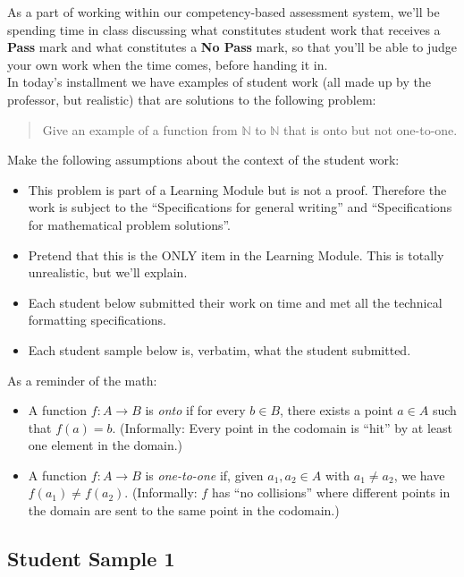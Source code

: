\documentclass[11pt,letterpaper]{article}
\begin{document}
As a part of working within our competency-based assessment system, we'll be spending time in class discussing what constitutes student work that receives a \textbf{Pass} mark and what constitutes a \textbf{No Pass} mark, so that you'll be able to judge your own work when the time comes, before handing it in. \\

In today's installment we have examples of student work (all made up by the professor, but realistic) that are solutions to the following problem: 
\begin{quote}
	Give an example of a function from $\mathbb{N}$ to $\mathbb{N}$ that is onto but not one-to-one. 
\end{quote}
Make the following assumptions about the context of the student work: 
\begin{itemize}
	\item This problem is part of a Learning Module but is not a proof. Therefore the work is subject to the ``Specifications for general writing'' and ``Specifications for mathematical problem solutions''. 
	\item Pretend that this is the ONLY item in the Learning Module. This is totally unrealistic, but we'll explain. 
	\item Each student below submitted their work on time and met all the technical formatting specifications. 
	\item Each student sample below is, verbatim, what the student submitted. 
\end{itemize}

As a reminder of the math: 
\begin{itemize}
	\item A function $f: A \rightarrow B$ is \emph{onto} if for every $b \in B$, there exists a point $a \in A$ such that $f(a) = b$. (Informally: Every point in the codomain is ``hit'' by at least one element in the domain.) 
	\item A function $f: A \rightarrow B$ is \emph{one-to-one} if, given $a_1, a_2 \in A$ with $a_1 \neq a_2$, we have $f(a_1) \neq f(a_2)$. (Informally: $f$ has ``no collisions'' where different points in the domain are sent to the same point in the codomain.) 
\end{itemize}

\subsection*{Student Sample 1} %
\label{sub:student_sample_1}
\end{document}
